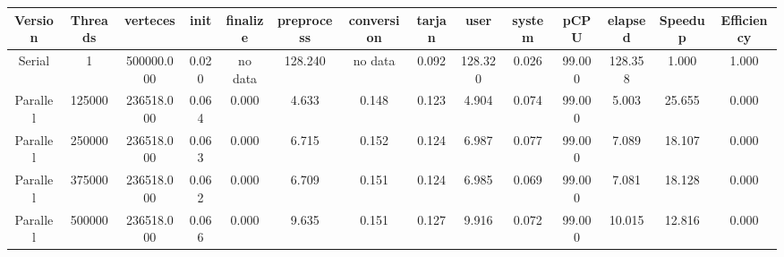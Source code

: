 \begin{tabular}{|c|c|c|c|c|c|c|c|c|c|c|c|c|c|}
\toprule
 Version &  Threads &   verteces &  init & finalize &  preprocess & conversion &  tarjan &    user &  system &   pCPU &  elapsed &  Speedup &  Efficiency \\
\midrule
  Serial &        1 & 500000.000 & 0.020 &  no data &     128.240 &    no data &   0.092 & 128.320 &   0.026 & 99.000 &  128.358 &    1.000 &       1.000 \\
Parallel &   125000 & 236518.000 & 0.064 &    0.000 &       4.633 &      0.148 &   0.123 &   4.904 &   0.074 & 99.000 &    5.003 &   25.655 &       0.000 \\
Parallel &   250000 & 236518.000 & 0.063 &    0.000 &       6.715 &      0.152 &   0.124 &   6.987 &   0.077 & 99.000 &    7.089 &   18.107 &       0.000 \\
Parallel &   375000 & 236518.000 & 0.062 &    0.000 &       6.709 &      0.151 &   0.124 &   6.985 &   0.069 & 99.000 &    7.081 &   18.128 &       0.000 \\
Parallel &   500000 & 236518.000 & 0.066 &    0.000 &       9.635 &      0.151 &   0.127 &   9.916 &   0.072 & 99.000 &   10.015 &   12.816 &       0.000 \\
\bottomrule
\end{tabular}
